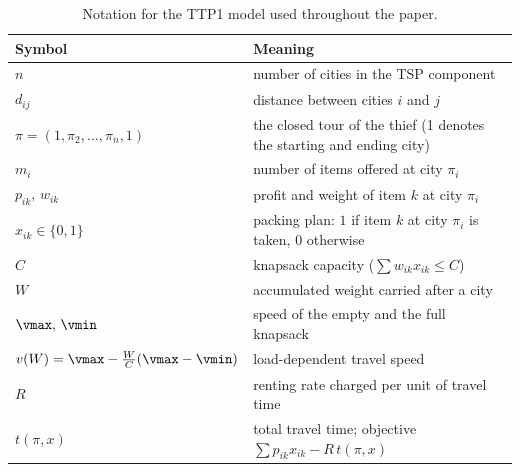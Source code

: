 \begin{table}[htbp]
\centering
\footnotesize
\caption{Notation for the TTP1 model used throughout the paper.}
\label{tab:notation}
\begin{tabular}{@{}ll@{}}
\toprule
\textbf{Symbol} & \textbf{Meaning} \\
\midrule
$n$ & number of cities in the TSP component \\
$d_{ij}$ & distance between cities $i$ and $j$ \\
$\pi=(1,\pi_2,\dots,\pi_n,1)$ & the closed tour of the thief (1 denotes the starting and ending city) \\
$m_i$ & number of items offered at city $\pi_i$ \\
$p_{ik},\,w_{ik}$ & profit and weight of item $k$ at city $\pi_i$ \\
$x_{ik}\in\{0,1\}$ & packing plan: $1$ if item $k$ at city $\pi_i$ is taken, 0 otherwise \\
$C$ & knapsack capacity ($\sum w_{ik}x_{ik}\le C$) \\
$W$ & accumulated weight carried after a city \\
$\vmax,\,\vmin$ & speed of the empty and the full knapsack \\
$v(W)=\vmax-\tfrac{W}{C}(\vmax-\vmin)$ & load-dependent travel speed \\
$R$ & renting rate charged per unit of travel time \\
$t(\pi,x)$ & total travel time; objective $\sum p_{ik}x_{ik}-R\,t(\pi,x)$ \\
\bottomrule
\end{tabular}
\end{table}
